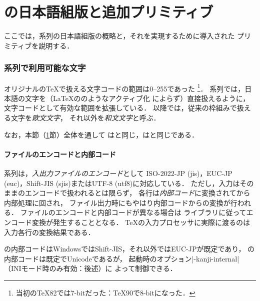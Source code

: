 \documentclass[a4paper,11pt,nomag,dvipdfmx]{jsarticle}
\begin{document}
\clearpage


\part{\pTeX の日本語組版と追加プリミティブ}

ここでは，\pTeX 系列の日本語組版の概略と，それを実現するために導入された
プリミティブを説明する．

\section{\pTeX 系列で利用可能な文字}
\label{sec:ptexchar}


オリジナルの\TeX で扱える文字コードの範囲は0--255であった
\footnote{当初の\TeX82では7-bitだった：\TeX90で8-bitになった．}．
\pTeX 系列では，日本語の文字を（\LaTeX ののようなアクティブ化
によらず）直接扱えるように，文字コードとして有効な範囲を拡張している．
以降では，従来の枠組みで扱える文字を\emph{欧文文字}，
それ以外を\emph{和文文字}と呼ぶ．

なお，本節（\ref{sec:ptexchar}節）全体を通して
\epTeX は\pTeX と同じ，\eupTeX は\upTeX と同じである．

\subsection{ファイルのエンコードと内部コード}
\pTeX 系列は，\emph{入出力ファイルのエンコード}として
ISO-2022-JP (jis)，EUC-JP (euc)，Shift-JIS (sjis)またはUTF-8 (utf8)に対応している．
ただし，入力はそのままのエンコードで扱われるとは限らず，
各行は\emph{内部コード}に変換されてから内部処理に回され，
ファイル出力時にもやはり内部コードからの変換が行われる．
ファイルのエンコードと内部コードが異なる場合は
ライブラリに従ってエンコード変換が発生することとなる．
\TeX の入力プロセッサに実際に渡るのは入力各行の変換結果である．

\pTeX の内部コードはWindowsではShift-JIS，それ以外ではEUC-JPが既定であり，
\upTeX の内部コードは既定でUnicodeであるが，
起動時のオプション|-kanji-internal|（INIモード時のみ有効：後述）に
よって制御できる．
\end{document}
